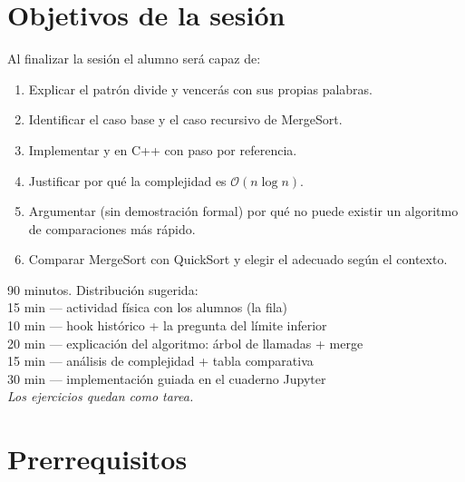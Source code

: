 \documentclass[12pt, oneside]{article}
\begin{document}

\tableofcontents
\newpage

\section{Objetivos de la sesión}

Al finalizar la sesión el alumno será capaz de:

\begin{enumerate}
  \item Explicar el patrón divide y vencerás con sus propias palabras.
  \item Identificar el caso base y el caso recursivo de MergeSort.
  \item Implementar  y  en C++ con paso por referencia.
  \item Justificar por qué la complejidad es $\mathcal{O}(n \log n)$.
  \item Argumentar (sin demostración formal) por qué no puede existir un algoritmo
        de comparaciones más rápido.
  \item Comparar MergeSort con QuickSort y elegir el adecuado según el contexto.
\end{enumerate}

\begin{notaprofesor}
  90 minutos. Distribución sugerida:\\
  15 min — actividad física con los alumnos (la fila) \\
  10 min — hook histórico + la pregunta del límite inferior \\
  20 min — explicación del algoritmo: árbol de llamadas + merge \\
  15 min — análisis de complejidad + tabla comparativa \\
  30 min — implementación guiada en el cuaderno Jupyter \\
  \textit{Los ejercicios quedan como tarea.}
\end{notaprofesor}

\section{Prerrequisitos}
\end{document}
